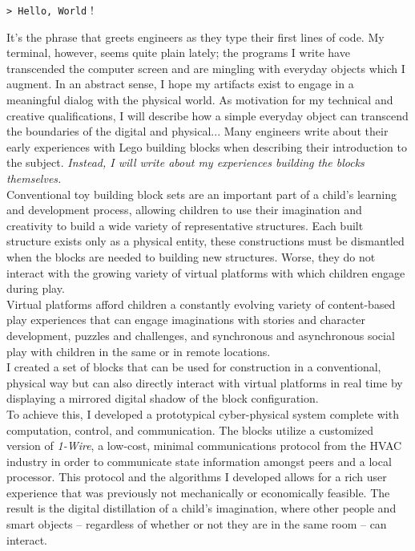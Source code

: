 \documentclass[]{article}
\title{}
\author{}
\begin{document}
\begin{addmargin}[0em]{2em}
\verb!> Hello, World! !
\vspace{2mm}
\end{addmargin}

It's the phrase that greets engineers as they type their first lines of code. My terminal, however, seems quite plain lately; the programs I write have transcended the computer screen and are mingling with everyday objects which I augment. In an abstract sense, I hope my artifacts exist to engage in a meaningful dialog with the physical world. As motivation for my technical and creative qualifications, I will describe how a simple everyday object can transcend the boundaries of the digital and physical... Many engineers write about their early experiences with Lego building blocks when describing their introduction to the subject. \emph{Instead, I will write about my experiences building the blocks themselves.}\\

Conventional toy building block sets are an important part of a child's learning and development process, allowing children to use their imagination and creativity to build a wide variety of representative structures. Each built structure exists only as a physical entity, these constructions must be dismantled when the blocks are needed to building new structures. Worse, they do not interact with the growing variety of virtual platforms with which children engage during play.\\

Virtual platforms afford children a constantly evolving variety of content-based play experiences that can engage imaginations with stories and character development, puzzles and challenges, and synchronous and asynchronous social play with children in the same or in remote locations.\\

I created a set of blocks that can be used for construction in a conventional, physical way but can also directly interact with virtual platforms in real time by displaying a mirrored digital shadow of the block configuration.\\

To achieve this, I developed a prototypical cyber-physical system complete with computation, control, and communication.  The blocks utilize a customized version of \emph{1-Wire}, a low-cost, minimal communications protocol from the HVAC industry in order to communicate state information amongst peers and a local processor. This protocol and the algorithms I developed allows for a rich user experience that was previously not mechanically or economically feasible. The result is the digital distillation of a child's imagination, where other people and smart objects -- regardless of whether or not they are in the same room -- can interact.\\
\end{document}
